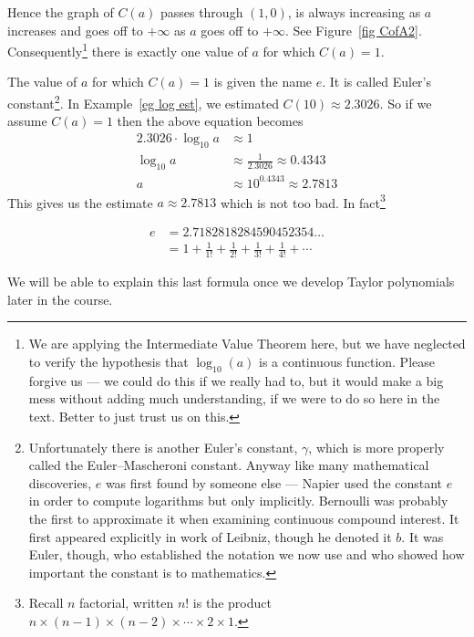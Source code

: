 Hence the graph of $C(a)$ passes through $(1,0)$, is always increasing as $a$
increases and goes off to $+\infty$  as $a$ goes off to $+\infty$. See Figure~\ref{fig
CofA2}. Consequently\footnote{We are applying the Intermediate Value Theorem here,
but we have neglected to verify the hypothesis that $\log_{10}(a)$
is a continuous function. Please forgive us --- we could do this if we really
had to, but it would make a big mess without adding much understanding, if we were to do
so here in the text. Better to just trust us on this.} there is exactly one value of $a$
for which
$C(a) = 1$.

The value of $a$ for which $C(a)=1$ is given the name $e$. It is called Euler's
constant\footnote{Unfortunately there is another Euler's constant, $\gamma$,
which is more properly called the  Euler--Mascheroni constant. Anyway like many
mathematical discoveries, $e$ was first found by someone else --- Napier used the
constant $e$ in order to compute logarithms but only implicitly. Bernoulli was probably
the first to approximate it when examining continuous compound interest. It first
appeared explicitly in work of Leibniz, though he denoted it $b$. It was Euler, though,
who established the notation we now use and who showed how important the constant is to
mathematics.}. %
In Example~\ref{eg log est}, we estimated $C(10)\approx 2.3026$. So if we
assume
$C(a)=1$ then the above equation becomes
\begin{align*}
  2.3026 \cdot \log_{10} a &\approx 1 \\
  \log_{10} a &\approx \frac{1}{2.3026} \approx 0.4343 \\
  a &\approx 10^{0.4343} \approx 2.7813
\end{align*}
This gives us the estimate $a \approx 2.7813$ which is not too bad. In
fact\footnote{Recall $n$ factorial, written $n!$ is the product
$n\times(n-1)\times(n-2)\times\cdots\times2\times1$.}
\begin{impeqn}\label{eq:eulerconst}
\begin{align*}
e &= 2.7182818284590452354\dots\\
  &= 1 + \frac{1}{1!} + \frac{1}{2!} + \frac{1}{3!} + \frac{1}{4!} + \cdots
\end{align*}
\end{impeqn}
We will be able to explain this last formula once we develop Taylor polynomials
later in
the course.

